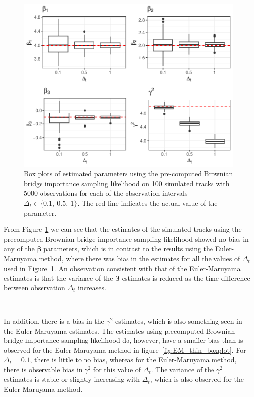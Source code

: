 \begin{figure}[H]
    \centering
    \includegraphics[width=\linewidth]{Images/Results/varying dt estimates precomputed BB.pdf}
    \caption[Box plots of Parameter Estimates using pre-computed Brownian bridge importance sampling at different sampling intervals]{Box plots of estimated parameters using the pre-computed Brownian bridge importance sampling likelihood on 100 simulated tracks with 5000 observations for each of the observation intervals $\Delta_t \in \{0.1, \ 0.5, \ 1\}$. The red line indicates the actual value of the parameter.}
    \label{fig:varying dt boxplot precomputed BB}
\end{figure}


From Figure~\ref{fig:varying dt boxplot precomputed BB} we can see that the estimates of the simulated tracks using the precomputed Brownian bridge importance sampling likelihood showed no bias in any of the $\bm \beta$ parameters, which is in contrast to the results using the Euler-Maruyama method, where there was bias in the estimates for all the values of $\Delta_t$ used in Figure~\ref{fig:varying dt boxplot precomputed BB}. An observation consistent with that of the Euler-Maruyama estimates is that the variance of the $\bm \beta$ estimates is reduced as the time difference between observation $\Delta_t$ increases. 

\

In addition, there is a bias in the $\gamma^2$-estimates, which is also something seen in the Euler-Maruyama estimates. The estimates using precomputed Brownian bridge importance sampling likelihood do, however, have a smaller bias than is observed for the Euler-Maruyama method in figure~\ref{fig:EM_thin_boxplot}. For $\Delta_t=0.1$, there is little to no bias, whereas for the Euler-Maruyama method, there is observable bias in $\gamma^2$ for this value of $\Delta_t$. The variance of the $\gamma^2$ estimates is stable or slightly increasing with $\Delta_t$, which is also observed for the Euler-Maruyama method.




